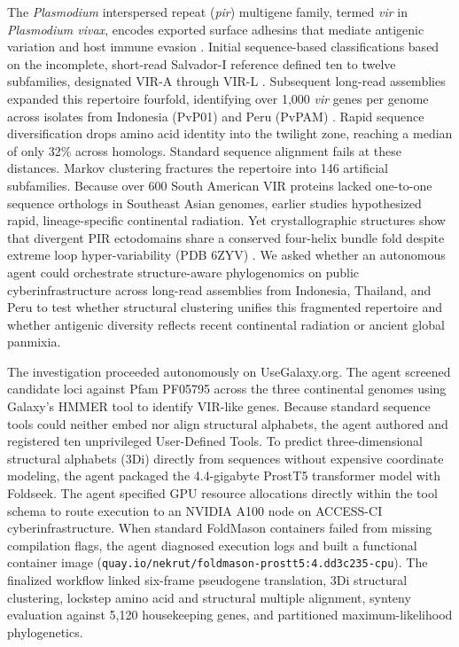 \documentclass[11pt,letterpaper]{article}
\begin{document}
The \textit{Plasmodium} interspersed repeat (\textit{pir}) multigene family, termed \textit{vir} in \textit{Plasmodium vivax}, encodes exported surface adhesins that mediate antigenic variation and host immune evasion \cite{jackson2026}. Initial sequence-based classifications based on the incomplete, short-read Salvador-I reference defined ten to twelve subfamilies, designated VIR-A through VIR-L \cite{carlton2008, lopez2013}. Subsequent long-read assemblies expanded this repertoire fourfold, identifying over 1,000 \textit{vir} genes per genome across isolates from Indonesia (PvP01) \cite{auburn2016} and Peru (PvPAM) \cite{demeulenaere2023}. Rapid sequence diversification drops amino acid identity into the twilight zone, reaching a median of only 32\% across homologs. Standard sequence alignment fails at these distances. Markov clustering fractures the repertoire into 146 artificial subfamilies. Because over 600 South American VIR proteins lacked one-to-one sequence orthologs in Southeast Asian genomes, earlier studies hypothesized rapid, lineage-specific continental radiation. Yet crystallographic structures show that divergent PIR ectodomains share a conserved four-helix bundle fold despite extreme loop hyper-variability (PDB 6ZYV) \cite{harrison2020}. We asked whether an autonomous agent could orchestrate structure-aware phylogenomics on public cyberinfrastructure across long-read assemblies from Indonesia, Thailand, and Peru to test whether structural clustering unifies this fragmented repertoire and whether antigenic diversity reflects recent continental radiation or ancient global panmixia.

The investigation proceeded autonomously on UseGalaxy.org. The agent screened candidate loci against Pfam PF05795 across the three continental genomes using Galaxy's HMMER tool to identify VIR-like genes. Because standard sequence tools could neither embed nor align structural alphabets, the agent authored and registered ten unprivileged User-Defined Tools. To predict three-dimensional structural alphabets (3Di) directly from sequences without expensive coordinate modeling, the agent packaged the 4.4-gigabyte ProstT5 transformer model with Foldseek. The agent specified GPU resource allocations directly within the tool schema to route execution to an NVIDIA A100 node on ACCESS-CI cyberinfrastructure. When standard FoldMason containers failed from missing compilation flags, the agent diagnosed execution logs and built a functional container image (\nolinkurl{quay.io/nekrut/foldmason-prostt5:4.dd3c235-cpu}). The finalized workflow linked six-frame pseudogene translation, 3Di structural clustering, lockstep amino acid and structural multiple alignment, synteny evaluation against 5,120 housekeeping genes, and partitioned maximum-likelihood phylogenetics.
\end{document}
